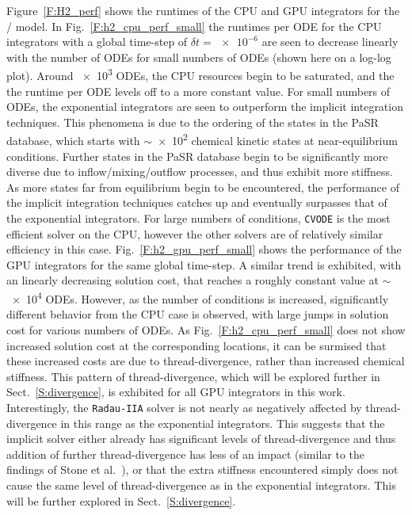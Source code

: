 \documentclass[final,twocolumn]{elsarticle}
\begin{document}
Figure~\ref{F:H2_perf} shows the runtimes of the CPU and GPU integrators for the \slash{} model.
In Fig.~\ref{F:h2_cpu_perf_small} the runtimes per ODE for the CPU integrators with a global time-step of $\delta t=\num{e-6}$ are seen to decrease linearly with the number of ODEs for small numbers of ODEs (shown here on a log-log plot).
Around \num{e3} ODEs, the CPU resources begin to be saturated, and the the runtime per ODE levels off to a more constant value.
For small numbers of ODEs, the exponential integrators are seen to outperform the implicit integration techniques.
This phenomena is due to the ordering of the states in the PaSR database, which starts with $\sim$\num{e2} chemical kinetic states at near-equilibrium conditions. 
Further states in the PaSR database begin to be significantly more diverse due to inflow\slash mixing\slash outflow processes, and thus exhibit more stiffness.
As more states far from equilibrium begin to be encountered, the performance of the implicit integration techniques catches up and eventually surpasses that of the exponential integrators.
For large numbers of conditions, \texttt{CVODE} is the most efficient solver on the CPU, however the other solvers are of relatively similar efficiency in this case.
Fig.~\ref{F:h2_gpu_perf_small} shows the performance of the GPU integrators for the same global time-step.
A similar trend is exhibited, with an linearly decreasing solution cost, that reaches a roughly constant value at $\sim$\num{e4} ODEs.
However, as the number of conditions is increased, significantly different behavior from the CPU case is observed, with large jumps in solution cost for various numbers of ODEs.
As Fig.~\ref{F:h2_cpu_perf_small} does not show increased solution cost at the corresponding locations, it can be surmised that these increased costs are due to thread-divergence, rather than increased chemical stiffness.
This pattern of thread-divergence, which will be explored further in Sect.~\ref{S:divergence}, is exhibited for all GPU integrators in this work.
Interestingly, the \texttt{Radau-IIA} solver is not nearly as negatively affected by thread-divergence in this range as the exponential integrators.
This suggests that the implicit solver either already has significant levels of thread-divergence and thus addition of further thread-divergence has less of an impact (similar to the findings of Stone et al.~\cite{Stone:2013aa}), or that the extra stiffness encountered simply does not cause the same level of thread-divergence as in the exponential integrators.
This will be further explored in Sect.~\ref{S:divergence}.
\end{document}
